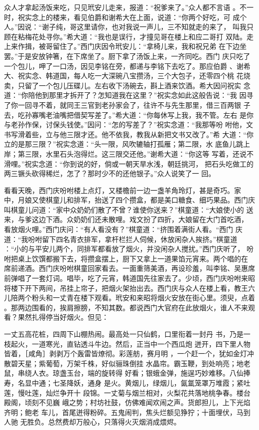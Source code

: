 众人才拿起汤饭来吃，只见玳安儿走来，报道：“祝爹来了。”众人都不言语
。不一时，祝实念上的楼来，看见伯爵和谢希大在上面，说道：“你两个好吃，可
成个人。”因说：“谢子纯，哥这里请你，也对我说一声儿，三不知就走的来了，
叫我只顾在粘梅花处寻你。”希大道：“我也是误行，才撞见哥在楼上和应二哥打
双陆。走上来作揖，被哥留住了。”西门庆因令玳安儿：“拿椅儿来，我和祝兄弟
在下边坐罢。”于是安放钟箸，在下席坐了。厨下拿了汤饭上来，一齐同吃。西门
庆只吃了一个包儿，呷了一口汤，因见李铭在旁，都递与李铭下去吃了。那应伯爵
、谢希大、祝实念、韩道国，每人吃一大深碗八宝攒汤，三个大包子，还零四个桃
花烧卖，只留了一个包儿压碟儿。左右收下汤碗去，斟上酒来饮酒。希大因问祝实
念道：“你陪他到那里才拆开了？怎知道我在这里？”祝实念如此这般告说：“我
因寻了你一回寻不着，就同王三官到老孙家会了，往许不与先生那里，借三百两银
子去，吃孙寡嘴老油嘴把借契写差了。”希大道：“你每休写上我，我不管。左右
是你与老孙作保，讨保头钱使。”因问：“怎的写差了？”祝实念道：“我那等吩
咐他，文书写滑着些，立与他三限才还。他不依我，教我从新把文书又改了。”希
大道：“你立的是那三限？”祝实念道：“头一限，风吹辘轴打孤雁；第二限，水
底鱼儿跳上岸；第三限，水里石头泡得烂。这三限交还他。”谢希大道：“你这等
写着，还说不滑哩。”祝实念道：“你到说的好，倘或一朝天旱水浅，朝廷挑河，
把石头吃做工的两三镢头砍得稀烂，怎了？那时少不的还他银子。”众人说笑了一
回。

看看天晚，西门庆吩咐楼上点灯，又楼檐前一边一盏羊角玲灯，甚是奇巧。家
中，月娘又使棋童儿和排军，抬送了四个攒盒，都是美口糖食、细巧果品。西门庆
叫棋童儿问道：“家中众奶奶们散了不曾？谁使你送来？”棋童道：“大娘使小的
送来，与爹这边下酒。众奶奶们还未散哩。戏文扮了四折，大娘留在大门首吃酒，
看放烟火哩。”西门庆问：“有人看没有？”棋童道：“挤围着满街人看。“西门
庆道：“我吩咐留下四名青衣排军，拿杆栏拦人伺候，休放闲杂人挨挤。”棋童道
：“小的与平安儿两个，同排军都看放了烟火，并没闲杂人搅扰。”西门庆听了，
吩咐把桌上饮馔都搬下去，将攒盒摆上，厨下又拿上一道果馅元宵来。两个唱的在
席前递酒。西门庆吩咐棋童回家看去。一面重筛美酒，再设珍羞，叫李铭、吴惠席
前弹唱了一套灯词。唱毕，吃了元宵，韩道国先往家去了。少顷，西门庆吩咐来昭
将楼下开下两间，吊挂上帘子，把烟火架抬出去。西门庆与众人在楼上看，教王六
儿陪两个粉头和一丈青在楼下观看。玳安和来昭将烟火安放在街心里。须臾，点着
。那两边围看的，挨肩擦膀，不知其数。都说西门大官府在此放烟火，谁人不来观
看？果然扎得停当好烟火。但见：

一丈五高花桩，四周下山棚热闹。最高处一只仙鹤，口里衔着一封丹
书，乃是一枝起火，一道寒光，直钻透斗牛边。然后，正当中一个西瓜炮
迸开，四下里人物皆着，［咸角］剥剥万个轰雷皆燎彻。彩莲舫，赛月明
，一个赶一个，犹如金灯冲散碧天星；紫葡萄，万架千株，好似骊珠倒挂
水晶帘。霸玉鞭，到处响亮；地老鼠，串绕人衣。琼盏玉台，端的旋转得
好看；银蛾金弹，施逞巧妙难移。八仙捧寿，名显中通；七圣降妖，通身
是火。黄烟儿，绿烟儿，氤氲笼罩万堆霞；紧吐莲，慢吐莲，灿烂争开十
段锦。一丈菊与烟兰相对，火梨花共落地桃争春。楼台殿阁，顷刻不见巍
峨之势；村坊社鼓，仿佛难闻欢闹之声。货郎担儿，上下光焰齐明；鲍老
车儿，首尾迸得粉碎。五鬼闹判，焦头烂额见狰狞；十面埋伏，马到人驰
无胜负。总然费却万般心，只落得火灭烟消成煨烬。

